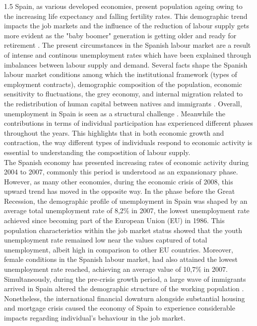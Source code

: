 \documentclass{article}
\begin{document}
\begin{spacing}{1.5}
 Spain, as various developed economies, present population ageing owing to the increasing life expectancy and falling fertility rates. This demographic trend impacts the job markets and the influence of the reduction of labour supply gets more evident as the "baby boomer" generation is getting older and ready for retirement \parencite{casares2018labor}. The present circumstances in the Spanish labour market are a result of intense and continous unemployment rates which have been explained through imbalances between labour supply and demand. Several facts shape the Spanish labour market conditions among which the institutional framework (types of employment contracts), demographic composition of the population, economic sensitivity to fluctuations, the grey economy, and internal migration related to the redistribution of human capital between natives and immigrants \parencite{bentolila1990mismatch,bentolila2010two,congregado2014unemployment,guell2021so}. Overall, unemployment in Spain is seen as a structural challenge \parencite{bentolila2020dual}. Meanwhile the contributions in terms of individual participation has experienced different phases throughout the years. This highlights that in both economic growth and contraction, the way different types of individuals respond to economic activity is essential to understanding the compostition of labour supply. \\

 The Spanish economy has presented increasing rates of economic activity during 2004 to 2007, commonly this period is understood as an expansionary phase. However, as many other economies, during the economic crisis of 2008, this upward trend has moved in the opposite way. In the phase before the Great Recession, the demographic profile of unemployment in Spain was shaped by an average total unemployment rate of 8,2\% in 2007, the lowest unemployment rate achieved since becoming part of the European Union (EU) in 1986. This population characteristics within the job market status showed that the youth unemployment rate remained low near the values captured of total unemployment, albeit high in comparison to other EU countries. Moreover, female conditions in the Spanish labour market, had also attained the lowest unemployment rate reached, achieving an average value of 10,7\% in 2007. Simultaneously, during the pre-crisis growth period, a large wave of immigrants arrived in Spain altered the demographic structure of the working population \parencite{amuedo2008complements, arango2013exceptional,gonzalez2011very}. Nonetheless, the international financial downturn alongside substantial housing and mortgage crisis caused the economy of Spain to experience considerable impacts regarding individual’s behaviour in the job market.\\


\end{spacing}
\end{document}
